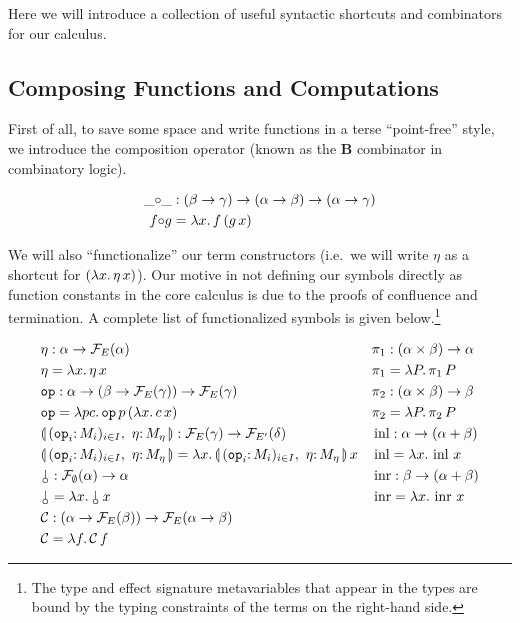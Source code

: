 Here we will introduce a collection of useful syntactic shortcuts and
combinators for our calculus.


\subsection{Composing Functions and Computations}
\label{ssec:composing-functions}

First of all, to save some space and write functions in a terse
``point-free'' style, we introduce the composition operator (known as the
$\textbf{B}$ combinator in combinatory logic).

\begin{align*}
  \_ {\mathbin{\circ}} \_ &: (\beta \to \gamma) \to (\alpha \to \beta) \to (\alpha \to \gamma) \\
  f {\mathbin{\circ}} g &= \lambda x.\, f\,(g\,x)
\end{align*}

We will also ``functionalize'' our term constructors (i.e.\ we will write
$\eta$ as a shortcut for $(\lambda x.\, \eta\,x)$). Our motive in not defining
our symbols directly as function constants in the core calculus is due to
the proofs of confluence and termination. A complete list of functionalized
symbols is given below.\footnote{The type and effect signature
  metavariables that appear in the types are bound by the typing
  constraints of the terms on the right-hand side.}

\begin{align*}
  &\eta : \alpha \to \FF_E(\alpha) &
  &\pi_1 : (\alpha \times \beta) \to \alpha \\
  &\eta = \lam{x}{\etaE{x}} &
  &\pi_1 = \lam{P}{\ap{\pi_1}{P}} \\
  &\op{op} : \alpha \to (\beta \to \FF_E(\gamma)) \to \FF_E(\gamma) &
  &\pi_2 : (\alpha \times \beta) \to \beta \\
  &\op{op} = \lam{p c}{\app{\op{op}}{p}{(\lam{x}{\ap{c}{x}})}} &
  &\pi_2 = \lam{P}{\ap{\pi_2}{P}} \\
  &\cibanana : \FF_E(\gamma) \to \FF_{E'}(\delta) &
  &\inl : \alpha \to (\alpha + \beta) \\
  &\cibanana = \lam{x}{\ap{\cibanana}{x}} &
  &\inl = \lam{x}{\ap{\inl}{x}} \\
  &\cherry : \FF_\emptyset(\alpha) \to \alpha &
  &\inr : \beta \to (\alpha + \beta) \\
  &\cherry = \lam{x}{\ap{\cherry}{x}} &
  &\inr = \lam{x}{\ap{\inr}{x}} \\
  &\CC : (\alpha \to \FF_E(\beta)) \to \FF_E(\alpha \to \beta) \\
  &\CC = \lam{f}{\ap{\CC}{f}} \\
\end{align*}

